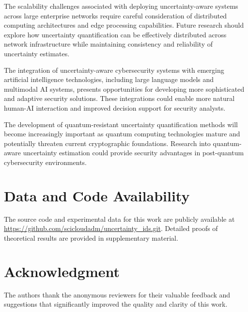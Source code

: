 \documentclass[journal]{IEEEtran}
\begin{document}
The scalability challenges associated with deploying uncertainty-aware systems across large enterprise networks require careful consideration of distributed computing architectures and edge processing capabilities. Future research should explore how uncertainty quantification can be effectively distributed across network infrastructure while maintaining consistency and reliability of uncertainty estimates.

The integration of uncertainty-aware cybersecurity systems with emerging artificial intelligence technologies, including large language models and multimodal AI systems, presents opportunities for developing more sophisticated and adaptive security solutions. These integrations could enable more natural human-AI interaction and improved decision support for security analysts.

The development of quantum-resistant uncertainty quantification methods will become increasingly important as quantum computing technologies mature and potentially threaten current cryptographic foundations. Research into quantum-aware uncertainty estimation could provide security advantages in post-quantum cybersecurity environments.

\section*{Data and Code Availability}

The source code and experimental data for this work are publicly available at \url{https://github.com/scicloudadm/uncertainty_ids.git}. Detailed proofs of theoretical results are provided in supplementary material.

\section*{Acknowledgment}

The authors thank the anonymous reviewers for their valuable feedback and suggestions that significantly improved the quality and clarity of this work.



\end{document}
